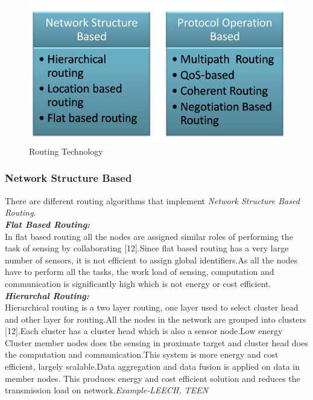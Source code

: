 \documentclass {report}
\begin{document}
\begin{figure}

\begin{center}
\includegraphics [scale=0.3]{images/rou}
\caption{Routing Technology}
\end{center}
\end{figure}


\subsubsection{Network Structure Based}
There are different routing algorithms that implement \emph{Network Structure Based Routing}.\\

\emph{{\bfseries Flat Based Routing:\\}}
In flat based routing all the nodes are assigned similar roles of performing the task of sensing by collaborating [12].Since flat based routing has a very large number of sensors, it is not efficient to assign global identifiers.As all the nodes have to perform all the tasks, 
the work load of sensing, computation and communication is significantly high which is not energy or cost efficient.\\

\emph{{\bfseries Hierarchal Routing:\\}}
Hierarchical routing is a two layer routing, one layer used to select cluster head and other layer for routing.All the nodes in the network are grouped into clusters [12].Each cluster has a cluster head which is also a sensor node.Low energy
Cluster member nodes does the sensing in proximate target and cluster head does the computation and communication.This system is more energy and cost efficient, largely scalable.Data aggregation and data fusion is applied on data in member nodes.
This produces energy and cost efficient solution and reduces the transmission load on network.\emph{Example-LEECH, TEEN\\}
\end{document}
